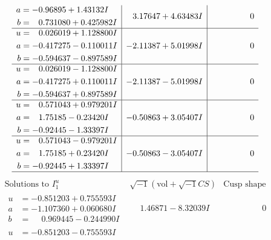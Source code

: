 \documentclass[1p]{elsarticle_modified}
\theoremstyle{definition}
\newcommand{\I}{\sqrt{-1}}
\begin{document}
$$\begin{array}{c|c|c}
\begin{aligned}
a &= -0.96895 + 1.43132 I \\
b &= \phantom{-}0.731080 + 0.425982 I\end{aligned}
 & \phantom{-}3.17647 + 4.63483 I & \phantom{-0.000000 } 0 \\ \hline\begin{aligned}
u &= \phantom{-}0.026019 + 1.128800 I \\
a &= -0.417275 - 0.110011 I \\
b &= -0.594637 - 0.897589 I\end{aligned}
 & -2.11387 + 5.01998 I & \phantom{-0.000000 } 0 \\ \hline\begin{aligned}
u &= \phantom{-}0.026019 - 1.128800 I \\
a &= -0.417275 + 0.110011 I \\
b &= -0.594637 + 0.897589 I\end{aligned}
 & -2.11387 - 5.01998 I & \phantom{-0.000000 } 0 \\ \hline\begin{aligned}
u &= \phantom{-}0.571043 + 0.979201 I \\
a &= \phantom{-}1.75185 - 0.23420 I \\
b &= -0.92445 - 1.33397 I\end{aligned}
 & -0.50863 + 3.05407 I & \phantom{-0.000000 } 0 \\ \hline\begin{aligned}
u &= \phantom{-}0.571043 - 0.979201 I \\
a &= \phantom{-}1.75185 + 0.23420 I \\
b &= -0.92445 + 1.33397 I\end{aligned}
 & -0.50863 - 3.05407 I & \phantom{-0.000000 } 0\\
 \hline 
 \end{array}$$\newpage$$\begin{array}{c|c|c}  
\text{Solutions to }I^u_{1}& \I (\text{vol} + \sqrt{-1}CS) & \text{Cusp shape}\\
 \hline 
\begin{aligned}
u &= -0.851203 + 0.755593 I \\
a &= -1.107360 + 0.060680 I \\
b &= \phantom{-}0.969445 - 0.244990 I\end{aligned}
 & \phantom{-}1.46871 - 8.32039 I & \phantom{-0.000000 } 0 \\ \hline\begin{aligned}
u &= -0.851203 - 0.755593 I \\

\end{aligned}
\end{array}$$
\end{document}
